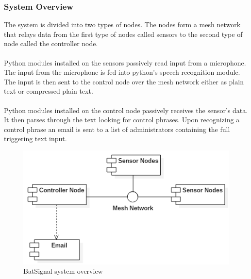 \documentclass[11pt,a4paper]{article}
\begin{document}
\subsubsection{System Overview}
The system is divided into two types of nodes.  The nodes form a mesh network that relays data from the first type of nodes called sensors to the second type of node called the controller node. \\\\
Python modules installed on the sensors passively read input from a microphone. The input from the microphone is fed into python's speech recognition module. The input is then sent to the control node over the mesh network either as plain text or compressed plain text. \\\\
Python modules installed on the control node passively receives the sensor's data.  It then parses through the text looking for control phrases.  Upon recognizing a control phrase an email is sent to a list of administrators containing the full triggering text input.
\begin{figure}[h!]
	\centering
		\includegraphics[scale=0.75, keepaspectratio=true]{Graphics/SimpleOverview.png}
	\caption{BatSignal system overview}
\end{figure}
\end{document}
